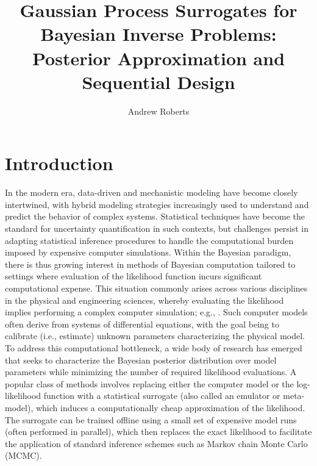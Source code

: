 \documentclass[12pt]{article}
\title{Gaussian Process Surrogates for Bayesian Inverse Problems: Posterior Approximation and Sequential Design}
\author{Andrew Roberts}
\begin{document}
\maketitle

\section{Introduction}
In the modern era, data-driven and mechanistic modeling have become closely intertwined, with hybrid modeling strategies 
increasingly used to understand and predict the behavior of complex systems. Statistical techniques have become 
the standard for uncertainty quantification in such contexts, but challenges persist in adapting statistical inference procedures
to handle the computational burden imposed by expensive computer simulations. 
Within the Bayesian paradigm, there is thus growing interest in methods of Bayesian computation tailored to settings 
where evaluation of the likelihood function incurs significant computational expense. 
This situation commonly arises across various disciplines in the physical and engineering sciences, whereby evaluating 
the likelihood implies performing a complex computer simulation; e.g., \citep{ESM_modeling_2pt0,FerEmulation}. 
Such computer models often derive from systems of differential equations, with the goal being to calibrate (i.e., estimate) 
unknown parameters characterizing the physical model.
To address this computational bottleneck, a wide body of research has emerged that seeks to characterize the Bayesian 
posterior distribution over model parameters while minimizing the number of required likelihood evaluations. 
A popular class of methods involves replacing either the computer model or the log-likelihood function with a statistical 
surrogate (also called an emulator or meta-model), which induces a computationally cheap approximation of the likelihood.
The surrogate can be trained offline \citep{modularization} using a small set of expensive model runs (often performed in 
parallel), which then replaces the exact likelihood to facilitate the application of 
standard inference schemes such as Markov chain Monte Carlo (MCMC).
\end{document}
